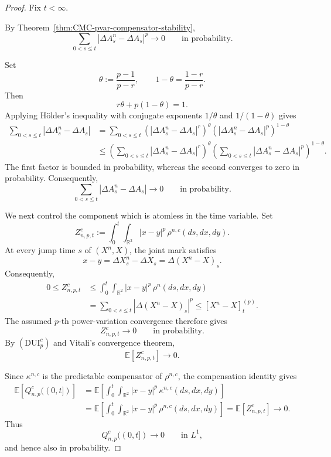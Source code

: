 \documentclass[a4paper,10pt]{article}
\newcommand{\E}{\mathbb E}
\begin{document}
\begin{proof}
Fix \(t<\infty\).

By Theorem~\ref{thm:CMC-pvar-compensator-stability},
\[
\sum_{0<s\le t}
|\Delta A^n_s-\Delta A_s|^p
\longrightarrow0
\qquad\text{in probability}.
\]


Set
\[
        \theta:=\frac{p-1}{p-r},
        \qquad
        1-\theta=\frac{1-r}{p-r}.
\]
Then
\[
        r\theta+p(1-\theta)=1.
\]
Applying Hölder's inequality with conjugate exponents
\(1/\theta\) and \(1/(1-\theta)\) gives
\[
\begin{aligned}
\sum_{0<s\le t}
|\Delta A^n_s-\Delta A_s|
&=
\sum_{0<s\le t}
\left(
|\Delta A^n_s-\Delta A_s|^r
\right)^\theta
\left(
|\Delta A^n_s-\Delta A_s|^p
\right)^{1-\theta}
\\
&\le
\left(
\sum_{0<s\le t}
|\Delta A^n_s-\Delta A_s|^r
\right)^\theta
\left(
\sum_{0<s\le t}
|\Delta A^n_s-\Delta A_s|^p
\right)^{1-\theta}.
\end{aligned}
\]
The first factor is bounded in probability, whereas the second
converges to zero in probability. Consequently,
\begin{equation}
\label{eq:p-ucp-atomic-total-variation}
\sum_{0<s\le t}
|\Delta A^n_s-\Delta A_s|
\longrightarrow0
\qquad\text{in probability}.
\end{equation}

We next control the component which is atomless in the time
variable. Set
\[
        Z_{n,p,t}^c
        :=
        \int_0^t\int_{\mathbb R^2}
        |x-y|^p\,\rho^{n,c}(ds,dx,dy).
\]
At every jump time \(s\) of \((X^n,X)\), the joint mark satisfies
\[
        x-y
        =
        \Delta X^n_s-\Delta X_s
        =
        \Delta(X^n-X)_s.
\]
Consequently,
\[
\begin{aligned}
0\le Z_{n,p,t}^c
&\le
\int_0^t\int_{\mathbb R^2}
|x-y|^p\,\rho^n(ds,dx,dy)
\\
&=
\sum_{0<s\le t}
|\Delta(X^n-X)_s|^p
\le
[X^n-X]^{(p)}_t.
\end{aligned}
\]
The assumed \(p\)-th power-variation convergence therefore gives
\[
        Z_{n,p,t}^c\longrightarrow0
        \qquad\text{in probability}.
\]
By \((\mathrm{DUI}_p^c)\) and Vitali's convergence theorem,
\begin{equation}
\label{eq:p-ucp-diffuse-realized-energy-expectation}
        \E[Z_{n,p,t}^c]\longrightarrow0.
\end{equation}

Since \(\kappa^{n,c}\) is the predictable compensator of
\(\rho^{n,c}\), the compensation identity gives
\[
\begin{aligned}
\E\left[Q_{n,p}^c((0,t])\right]
&=
\E\left[
\int_0^t\int_{\mathbb R^2}
|x-y|^p\,\kappa^{n,c}(ds,dx,dy)
\right]
\\
&=
\E\left[
\int_0^t\int_{\mathbb R^2}
|x-y|^p\,\rho^{n,c}(ds,dx,dy)
\right]
=
\E[Z_{n,p,t}^c]
\longrightarrow0.
\end{aligned}
\]
Thus
\begin{equation}
\label{eq:p-ucp-diffuse-compensator-energy}
        Q_{n,p}^c((0,t])
        \longrightarrow0
        \qquad\text{in }L^1,
\end{equation}
and hence also in probability.


\end{proof}
\end{document}

